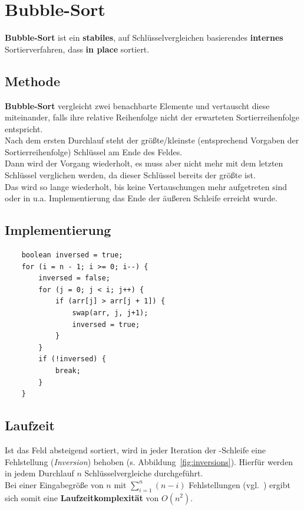 \section{Bubble-Sort}

\textbf{Bubble-Sort} ist ein \textbf{stabiles}, auf Schlüsselvergleichen basierendes \textbf{internes} Sortierverfahren, dass \textbf{in place} sortiert.

\subsection{Methode}
\textbf{Bubble-Sort} vergleicht zwei benachbarte Elemente und vertauscht diese miteinander, falls ihre relative Reihenfolge nicht der erwarteten Sortierreihenfolge entspricht.\\
Nach dem ersten Durchlauf steht der größte/kleinste (entsprechend Vorgaben der Sortierreihenfolge) Schlüssel am Ende des Feldes.\\
Dann wird der Vorgang wiederholt, es muss aber nicht mehr mit dem letzten Schlüssel verglichen werden, da dieser Schlüssel bereits der größte ist.\\
Das wird so lange wiederholt, bis keine Vertauschungen mehr aufgetreten sind oder in u.a. Implementierung das Ende der äußeren Schleife erreicht wurde.\\

\subsection{Implementierung}

\begin{verbatim}
    boolean inversed = true;
    for (i = n - 1; i >= 0; i--) {
        inversed = false;
        for (j = 0; j < i; j++) {
            if (arr[j] > arr[j + 1]) {
                swap(arr, j, j+1);
                inversed = true;
            }
        }
        if (!inversed) {
            break;
        }
    }
\end{verbatim}

\subsection{Laufzeit}
Ist das Feld absteigend sortiert, wird in jeder Iteration der -Schleife eine Fehlstellung (\textit{Inversion}) behoben (s. Abbildung~\ref{fig:inversions}).
Hierfür werden in jedem Durchlauf $n$ Schlüsselvergleiche durchgeführt.\\
Bei einer Eingabegröße von $n$ mit $\sum_{i=1}^n (n-i)$  Fehlstellungen (vgl.~\cite[87]{OW17b}) ergibt sich somit eine \textbf{Laufzeitkomplexität} von $O(n^2)$.


